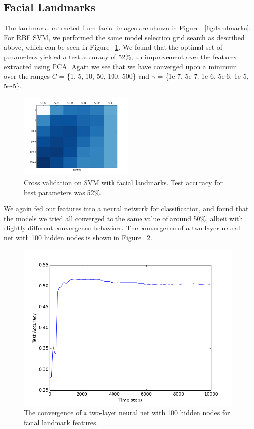 \documentclass[10pt, twocolumn, twoside]{article}
\begin{document}
\subsection{Facial Landmarks}

The landmarks extracted from facial images are shown in Figure ~\ref{fig:landmarks}.
For RBF SVM, we performed the same model selection grid search as described above,
which can be seen in Figure ~\ref{fig:grid_landmarks}.
We found that the optimal set of parameters yielded a test accuracy of 52\%, an
improvement over the features extracted using PCA. Again we see that we have
converged upon a minimum over the ranges $C$ = \{1, 5, 10, 50, 100, 500\} and
$\gamma$ = \{1e-7, 5e-7, 1e-6, 5e-6, 1e-5, 5e-5\}.

\begin{figure}[!htbp]
\centering
\includegraphics[width=0.5\textwidth]{grid_search_landmarks}
\caption{\label{fig:grid_landmarks} Cross validation on SVM with facial landmarks.
Test accuracy for best parameters was 52\%.}
\end{figure}

We again fed our features into a neural network for classification, and found that
the models we tried all converged to the same value of around 50\%, albeit with
slightly different convergence behaviors. The convergence of a two-layer neural net
with 100 hidden nodes is shown in Figure ~\ref{fig:landmarks_nnet}.

\begin{figure}[!htbp]
\centering
\includegraphics[width=\linewidth]{landmarks_nn_accuracy}
\caption{\label{fig:landmarks_nnet} The convergence of a two-layer neural net with 100
hidden nodes for facial landmark features.}
\end{figure}
\end{document}
